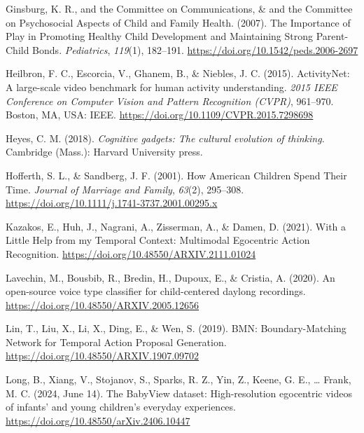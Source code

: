 \documentclass[
  man,floatsintext]{apa6}
\newlength{\cslhangindent}
\newenvironment{CSLReferences}[2] %
 {\begin{list}{}{%
  \setlength{\itemindent}{0pt}
  \setlength{\leftmargin}{0pt}
  \setlength{\parsep}{0pt}
  \ifodd #1
   \setlength{\leftmargin}{\cslhangindent}
   \setlength{\itemindent}{-1\cslhangindent}
  \fi
  \setlength{\itemsep}{#2\baselineskip}}}
 {\end{list}}
\begin{document}
\begin{CSLReferences}{1}{0}
Ginsburg, K. R., and the Committee on Communications, \& and the Committee on Psychosocial Aspects of Child and Family Health. (2007). The {Importance} of {Play} in {Promoting Healthy Child Development} and {Maintaining Strong Parent-Child Bonds}. \emph{Pediatrics}, \emph{119}(1), 182--191. \url{https://doi.org/10.1542/peds.2006-2697}

Heilbron, F. C., Escorcia, V., Ghanem, B., \& Niebles, J. C. (2015). {ActivityNet}: {A} large-scale video benchmark for human activity understanding. \emph{2015 {IEEE Conference} on {Computer Vision} and {Pattern Recognition} ({CVPR})}, 961--970. Boston, MA, USA: IEEE. \url{https://doi.org/10.1109/CVPR.2015.7298698}

Heyes, C. M. (2018). \emph{Cognitive gadgets: The cultural evolution of thinking}. Cambridge (Mass.): Harvard University press.

Hofferth, S. L., \& Sandberg, J. F. (2001). How {American Children Spend Their Time}. \emph{Journal of Marriage and Family}, \emph{63}(2), 295--308. \url{https://doi.org/10.1111/j.1741-3737.2001.00295.x}

Kazakos, E., Huh, J., Nagrani, A., Zisserman, A., \& Damen, D. (2021). With a {Little Help} from my {Temporal Context}: {Multimodal Egocentric Action Recognition}. \url{https://doi.org/10.48550/ARXIV.2111.01024}

Lavechin, M., Bousbib, R., Bredin, H., Dupoux, E., \& Cristia, A. (2020). An open-source voice type classifier for child-centered daylong recordings. \url{https://doi.org/10.48550/ARXIV.2005.12656}

Lin, T., Liu, X., Li, X., Ding, E., \& Wen, S. (2019). {BMN}: {Boundary-Matching Network} for {Temporal Action Proposal Generation}. \url{https://doi.org/10.48550/ARXIV.1907.09702}

Long, B., Xiang, V., Stojanov, S., Sparks, R. Z., Yin, Z., Keene, G. E., \ldots{} Frank, M. C. (2024, June 14). The {BabyView} dataset: {High-resolution} egocentric videos of infants' and young children's everyday experiences. \url{https://doi.org/10.48550/arXiv.2406.10447}


\end{CSLReferences}
\end{document}
